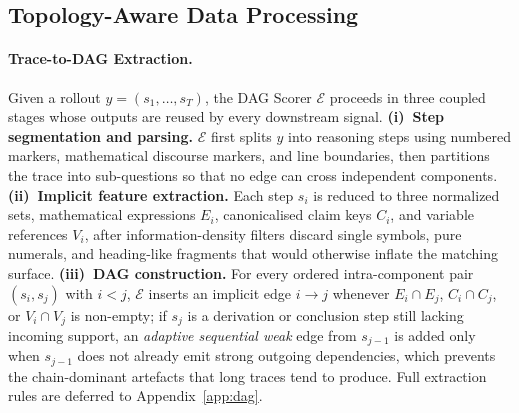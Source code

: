 \subsection{Topology-Aware Data Processing}
\label{sec:reward_module}

\paragraph{Trace-to-DAG Extraction.}
Given a rollout $y=(s_1,\dots,s_T)$, the DAG Scorer $\mathcal{E}$ proceeds in three coupled stages whose outputs are reused by every downstream signal. \textbf{(i)~Step segmentation and parsing.} $\mathcal{E}$ first splits $y$ into reasoning steps using numbered markers, mathematical discourse markers, and line boundaries, then partitions the trace into sub-questions so that no edge can cross independent components. \textbf{(ii)~Implicit feature extraction.} Each step $s_i$ is reduced to three normalized sets, mathematical expressions $E_i$, canonicalised claim keys $C_i$, and variable references $V_i$, after information-density filters discard single symbols, pure numerals, and heading-like fragments that would otherwise inflate the matching surface. \textbf{(iii)~DAG construction.} For every ordered intra-component pair $(s_i,s_j)$ with $i\!<\!j$, $\mathcal{E}$ inserts an implicit edge $i\!\to\!j$ whenever $E_i\!\cap\!E_j$, $C_i\!\cap\!C_j$, or $V_i\!\cap\!V_j$ is non-empty; if $s_j$ is a derivation or conclusion step still lacking incoming support, an \emph{adaptive sequential weak} edge from $s_{j-1}$ is added only when $s_{j-1}$ does not already emit strong outgoing dependencies, which prevents the chain-dominant artefacts that long traces tend to produce. Full extraction rules are deferred to Appendix~\ref{app:dag}.

